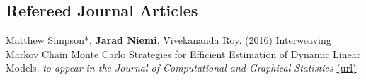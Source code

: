 \documentclass[overlapped,line]{res}
\begin{document}
\begin{resume}
% 
% 
% 
% 
% 
% 
% 
% 
% 
% 
% 
% 
% 

\subsection{\bf Refereed Journal Articles}

\vspace{-0.2in}

Matthew Simpson*, {\bf Jarad Niemi}, Vivekananda Roy. (2016) Interweaving Markov Chain Monte Carlo Strategies for Efficient Estimation of Dynamic Linear Models. \emph{to appear in the Journal of Computational and Graphical Statistics} \href{http://www.tandfonline.com/doi/abs/10.1080/10618600.2015.1105748}{(url)}


\end{resume}
\end{document}
